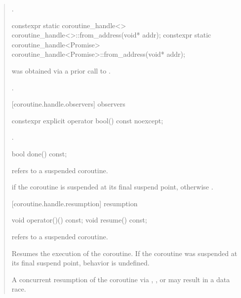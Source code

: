 \begin{quote}
\begin{itemdescr}
	\pnum
	\returns {}.
\end{itemdescr}


\begin{itemdecl}
  constexpr static coroutine_handle<> coroutine_handle<>::from_address(void* addr);		
  constexpr static coroutine_handle<Promise> coroutine_handle<Promise>::from_address(void* addr);		
\end{itemdecl}

\begin{itemdescr}
	\pnum
	\precondition {} was obtained via a prior call to .
	
	\pnum
	\postconditions {}.
\end{itemdescr}

[coroutine.handle.observers]{ observers}
\begin{itemdecl}
  constexpr explicit operator bool() const noexcept;
\end{itemdecl}

\begin{itemdescr}
  \pnum
  \returns {}.
\end{itemdescr}

\begin{itemdecl}
  bool done() const; 
\end{itemdecl}
\begin{itemdescr}
  \pnum
  \precondition {} refers to a suspended coroutine.
	
  \pnum
  \returns {} if the coroutine is suspended
    at its final suspend point, otherwise .
\end{itemdescr}

[coroutine.handle.resumption]{ resumption}
\begin{itemdecl}
  void operator()() const;
  void resume() const;	
\end{itemdecl}
\begin{itemdescr}
  \pnum
  \precondition {} refers to a suspended coroutine.
  
  \pnum
  \effects Resumes the execution of the coroutine. If the coroutine was suspended
  at its final suspend point, behavior is undefined.
  
  \pnum
  \enternote A concurrent resumption of the coroutine via , , or  may result in a data race.
  \exitnote
\end{itemdescr}


\end{quote}
